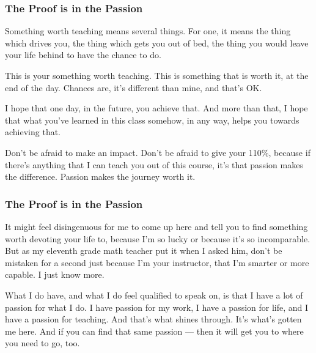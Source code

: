\documentclass[aspectratio=169, handout]{beamer}
\begin{document}
\begin{frame}[fragile]
  \frametitle{The Proof is in the Passion}

  Something worth teaching means several things. For one, it means the thing
  which drives you, the thing which gets you out of bed, the thing you would
  leave your life behind to have the chance to do.

  \pause
  \vspace{\fill}

  This is your something worth teaching. This is something that is worth it, at
  the end of the day. Chances are, it’s different than mine, and that’s OK.

  \pause
  \vspace{\fill}

  I hope that one day, in the future, you achieve that. And more than that, I hope
  that what you’ve learned in this class somehow, in any way, helps you towards
  achieving that.

  \pause
  \vspace{\fill}

  Don’t be afraid to make an impact. Don’t be afraid to give your 110\%, because if
  there’s anything that I can teach you out of this course, it’s that passion
  makes the difference. Passion makes the journey worth it.
\end{frame}

\begin{frame}[fragile]
  \frametitle{The Proof is in the Passion}

  It might feel disingenuous for me to come up here and tell you to find
  something worth devoting your life to, because I’m so lucky or because it’s so
  incomparable. But as my eleventh grade math teacher put it when I asked him,
  don’t be mistaken for a second just because I’m your instructor, that I’m
  smarter or more capable. I just know more.

  \pause
  \vspace{\fill}

  What I do have, and what I do feel qualified to speak on, is that I have a lot
  of passion for what I do. I have passion for my work,  I have a passion for
  life, and I have a passion for teaching. And that’s what shines through. It’s
  what’s gotten me here. And if you can find that same passion — then it will
  get you to where you need to go, too.
\end{frame}

\end{document}
